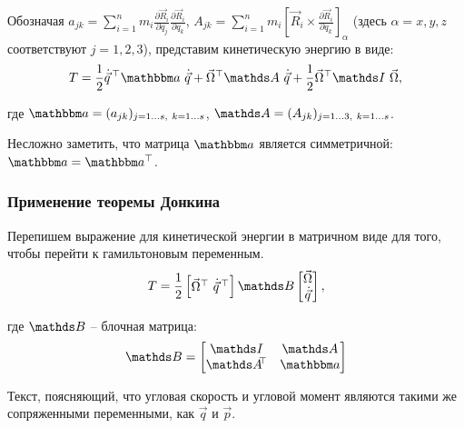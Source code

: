 Обозначая $a_{jk} = \sum_{i=1}^{n} m_i \frac{\partial \vec{R}_i}{\partial q_j} \frac{\partial \vec{R}_i}{\partial q_k}$, $A_{jk} = \sum_{i=1}^{n} m_i \left[ \vec{R}_i \times \frac{\partial \vec{R}_i}{\partial q_k} \right]_{\alpha}$ (здесь $\alpha = x,y,z$ соответствуют $j=1,2,3$), представим кинетическую энергию в виде:
\vverh
\begin{gather}
T = \frac{1}{2} \dot{\vec{q}}^{\, \top} \bba \ \dot{\vec{q}} + \vec{\Omega}^\top \bbA \ \dot{\vec{q}} + \frac{1}{2} \vec{\Omega}^\top \bbI \ \vec{\Omega} \notag ,
\end{gather}

\vlevo где $\bba = (a_{jk})_{j=1 \dots s, \ k=1 \dots s}$, $\bbA = (A_{jk})_{j=1 \dots 3, \ k=1 \dots s}$.

Несложно заметить, что матрица $\bba$ является симметричной: $\bba = \bba^{\top}$.

\subsubsection{Применение теоремы Донкина}
Перепишем выражение для кинетической энергии в матричном виде для того, чтобы перейти к гамильтоновым переменным.
\begin{gather}
T = \frac{1}{2} 
\begin{bmatrix}
\vec{\Omega}^{\top} \ \dot{\vec{q}}^{\, \top}
\end{bmatrix}
\bbB
\begin{bmatrix}
\vec{\Omega} \\
\dot{\vec{q}}
\end{bmatrix}, \notag
\end{gather}

где $\bbB$ -- блочная матрица:
\begin{gather}
\bbB = 
\begin{bmatrix}
\bbI & \bbA \\
\bbA^{\dn \top} & \bba
\end{bmatrix} \notag
\end{gather}  

\begin{minipage}[c]{0.55\linewidth}
\end{minipage}
\begin{minipage}[c]{0.4\linewidth}
Текст, поясняющий, что угловая скорость и угловой момент являются такими же сопряженными переменными, как $\vec{q}$ и $\vec{p}$.
\end{minipage} \\

